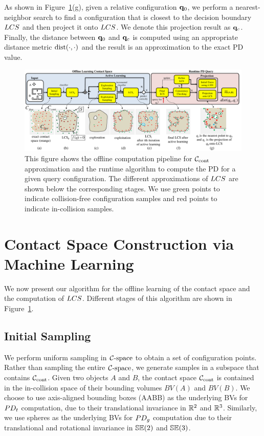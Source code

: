 As shown in Figure~\ref{fig:2:pipeline}(g), given a relative configuration $\mathbf q_0$, we perform
a nearest-neighbor search to find a configuration that is closest to the decision boundary $LCS$ and then project it
onto $LCS$. We denote this projection result as $\mathbf q_c$.
Finally, the distance between $\mathbf q_0$ and $\mathbf q_c$ is computed using an appropriate distance metric $\operatorname{dist}(\cdot, \cdot)$ and the result is an approximation to the exact PD value.


\begin{figure}[htb]
  \centering
  \includegraphics[width=\linewidth]{figs/2/pipeline.pdf}
  \caption[Offline computation pipeline for $\Ccont$ approximation and the runtime algorithm to compute the PD for a given query configuration]{This figure shows the offline computation pipeline for $\Ccont$ approximation and the runtime algorithm to compute the PD for a given query configuration. The different approximations of $LCS$ are shown below the corresponding stages. We use green points to indicate collision-free configuration samples and red points to indicate in-collision samples.}
  \label{fig:2:pipeline}
\end{figure}

\section{Contact Space Construction via Machine Learning}
\label{sec:2:learning}
We now present our algorithm for the offline learning of the contact space and the computation of $LCS$. Different stages of this algorithm
are shown in Figure~\ref{fig:2:pipeline}.

\subsection{Initial Sampling}
\label{sec:2:offline:uniform}

We perform uniform sampling in $\mathcal C\text{-space}$ to obtain a set of configuration points. Rather than sampling the entire $\mathcal C\text{-space}$,
we generate samples in a subspace that contains $\Ccont$. Given two objects $A$ and $B$, the contact space $\Ccont$ is contained in the in-collision space of their bounding volumes $BV(A)$ and $BV(B)$. We choose to use
axis-aligned bounding boxes (AABB) as the underlying BVs for $PD_t$
computation, due to their translational invariance in $\mathbb R^2$
and $\mathbb R^3$. Similarly, we use spheres as the underlying BVs for $PD_g$
computation due to their translational and rotational invariance in
$\mathbb {SE}(2)$ and $\mathbb {SE}(3)$.

